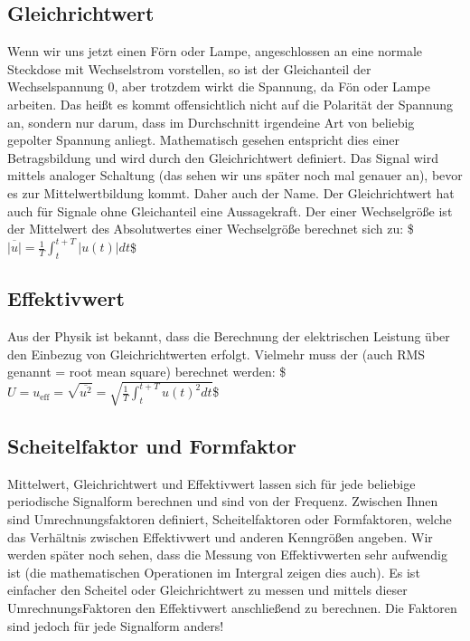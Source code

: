 \documentclass[letterpaper,10pt,english]{jupyterBook}
\begin{document}
\subsection{Gleichrichtwert}
\label{\detokenize{content/3_Kenngroessen:gleichrichtwert}}
\sphinxAtStartPar
Wenn wir uns jetzt einen Förn oder Lampe, angeschlossen an eine normale Steckdose mit Wechselstrom vorstellen, so ist der Gleichanteil der Wechselspannung 0, aber trotzdem wirkt die Spannung, da Fön oder Lampe arbeiten. Das heißt es kommt offensichtlich nicht auf die Polarität der Spannung an, sondern nur darum, dass im Durchschnitt irgendeine Art von beliebig gepolter Spannung anliegt. Mathematisch gesehen entspricht dies einer Betragsbildung und wird durch den Gleichrichtwert definiert.  Das Signal wird mittels analoger Schaltung  (das sehen wir uns später noch mal genauer an), bevor es zur Mittelwertbildung kommt. Daher auch der Name. Der Gleichrichtwert hat auch für Signale ohne Gleichanteil eine Aussagekraft. Der  einer Wechselgröße ist der Mittelwert des Absolutwertes einer Wechselgröße berechnet sich zu:
\$\(\overline{|u|} = \frac{1}{T}\int_{t}^{t+T} |u(t)|dt\)\$


\subsection{Effektivwert}
\label{\detokenize{content/3_Kenngroessen:effektivwert}}
\sphinxAtStartPar
Aus der Physik ist bekannt, dass die Berechnung der elektrischen Leistung  über den Einbezug von Gleichrichtwerten erfolgt. Vielmehr muss der  (auch RMS genannt = root mean square) berechnet werden:
\$\(U = u_\mathrm{eff} = \sqrt{\overline{u^2}} = \sqrt{\frac{1}{T}\int_{t}^{t+T}u(t)^2dt}\)\$


\subsection{Scheitelfaktor und Formfaktor}
\label{\detokenize{content/3_Kenngroessen:scheitelfaktor-und-formfaktor}}
\sphinxAtStartPar
Mittelwert, Gleichrichtwert und Effektivwert lassen sich für jede beliebige periodische Signalform berechnen und sind  von der Frequenz. Zwischen Ihnen sind Umrechnungsfaktoren definiert, Scheitelfaktoren oder Formfaktoren, welche das Verhältnis zwischen Effektivwert und anderen Kenngrößen angeben. Wir werden später noch sehen, dass die Messung von Effektivwerten sehr aufwendig ist (die mathematischen Operationen im Intergral zeigen dies auch). Es ist einfacher den Scheitel\sphinxhyphen{} oder Gleichrichtwert zu messen und mittels dieser Umrechnungs\sphinxhyphen{}Faktoren den Effektivwert anschließend zu berechnen. Die Faktoren sind jedoch für jede Signalform anders!
\end{document}
